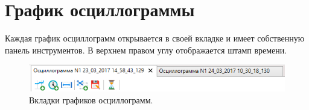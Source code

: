 \documentclass[a4paper,12pt]{article}
\begin{document}
 
 
 
\section*{\hspace{.5cm} График осциллограммы} 
\hspace{.5cm}Каждая график осциллограмм открывается в своей вкладке и имеет собственную панель инструментов. В верхнем правом углу отображается штамп времени.  
 
 
\begin{figure}[h] 
\centering 
\includegraphics[width=60ex]{image/Screenshot_2.png} 
\caption{Вкладки графиков осциллограмм.} 
\end{figure} 
\end{document}
